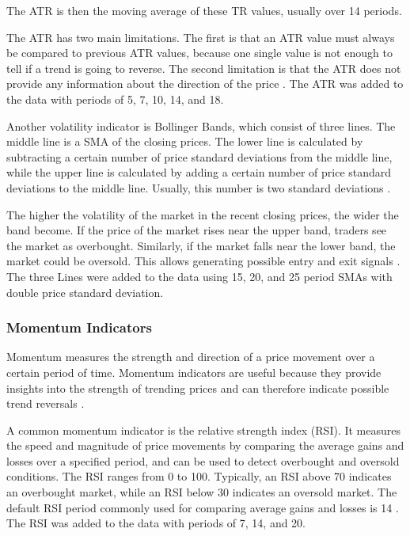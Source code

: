 \noindent
The ATR is then the moving average of these TR values, usually over 14 periods.

The ATR has two main limitations.
The first is that an ATR value must always be compared to previous ATR values, because one single value is not enough to tell if a trend is going to reverse.
The second limitation is that the ATR does not provide any information about the direction of the price \cite{investopia-atr}.
The ATR was added to the data with periods of 5, 7, 10, 14, and 18.

Another volatility indicator is Bollinger Bands, which consist of three lines.
The middle line is a SMA of the closing prices.
The lower line is calculated by subtracting a certain number of price standard deviations from the middle line, while the upper line is calculated by adding a certain number of price standard deviations to the middle line.
Usually, this number is two standard deviations \cite{investopia-bb}.

The higher the volatility of the market in the recent closing prices, the wider the band become.
If the price of the market rises near the upper band, traders see the market as overbought.
Similarly, if the market falls near the lower band, the market could be oversold.
This allows generating possible entry and exit signals \cite{investopia-bb}.
The three Lines were added to the data using 15, 20, and 25 period SMAs with double price standard deviation.

\subsubsection{Momentum Indicators}

Momentum measures the strength and direction of a price movement over a certain period of time.
Momentum indicators are useful because they provide insights into the strength of trending prices and can therefore indicate possible trend reversals \cite{investopia-momentum}.

A common momentum indicator is the relative strength index (RSI).
It measures the speed and magnitude of price movements by comparing the average gains and losses over a specified period, and can be used to detect overbought and oversold conditions.
The RSI ranges from 0 to 100.
Typically, an RSI above 70 indicates an overbought market, while an RSI below 30 indicates an oversold market.
The default RSI period commonly used for comparing average gains and losses is 14 \cite{investopia-rsi}.
The RSI was added to the data with periods of 7, 14, and 20.

